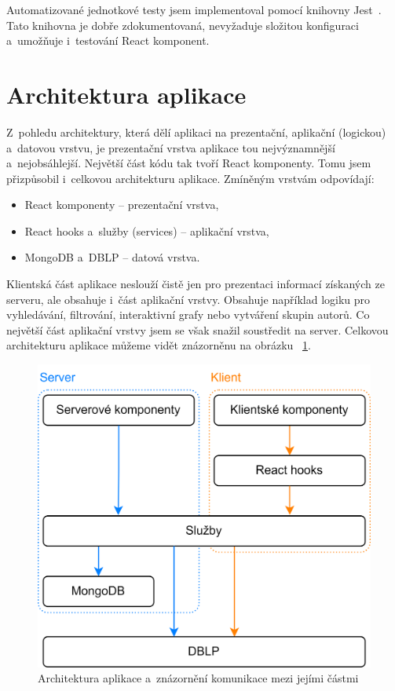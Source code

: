 \documentclass[
  biblatex,
  sourcecodes,
  glossaries,
  index
]{kidiplom}
\begin{document}
Automatizované jednotkové testy jsem implementoval pomocí knihovny Jest~\cite{t32}. Tato knihovna je dobře zdokumentovaná, nevyžaduje složitou konfiguraci a~umožňuje i~testování React komponent.

\newpage

\section{Architektura aplikace}

Z~pohledu architektury, která dělí aplikaci na prezentační, aplikační (logickou) a~datovou vrstvu, je prezentační vrstva aplikace tou nejvýznamnější a~nejobsáhlejší. Největší část kódu tak tvoří React komponenty. Tomu jsem přizpůsobil i~celkovou architekturu aplikace. Zmíněným vrstvám odpovídají:
\begin{itemize}
\item React komponenty -- prezentační vrstva,
\item React hooks a~služby (services) -- aplikační vrstva,
\item MongoDB a~DBLP -- datová vrstva.
\end{itemize}

Klientská část aplikace neslouží čistě jen pro prezentaci informací získaných ze serveru, ale obsahuje i~část aplikační vrstvy. Obsahuje například logiku pro vyhledávání, filtrování, interaktivní grafy nebo vytváření skupin autorů. Co největší část aplikační vrstvy jsem se však snažil soustředit na server. Celkovou architekturu aplikace můžeme vidět znázorněnu na obrázku ~\ref{fig:architektura_aplikace}.

\begin{figure}[H]
\begin{center}
\includegraphics[width=12cm]{architektura_aplikace}
\caption{Architektura aplikace a~znázornění komunikace mezi jejími částmi}\label{fig:architektura_aplikace}
\end{center}
\end{figure}
\end{document}
